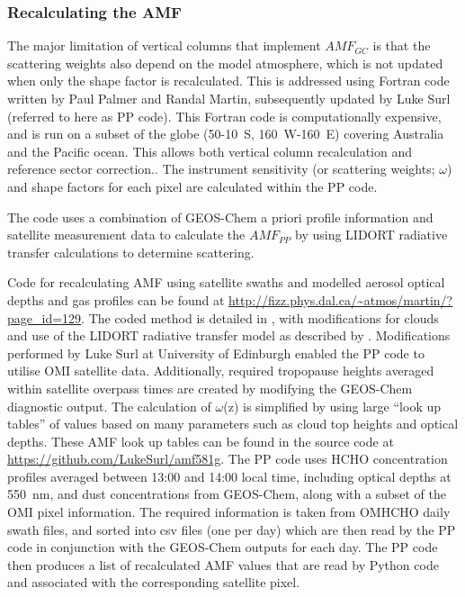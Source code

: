     \subsubsection{Recalculating the AMF}
      \label{Model:omiRecalc:ppcode}
      
      
      The major limitation of vertical columns that implement $AMF_{GC}$ is that the scattering weights also depend on the model atmosphere, which is not updated when only the shape factor is recalculated.
      This is addressed using Fortran code written by Paul Palmer and Randal Martin, subsequently updated by Luke Surl (referred to here as PP code).
      This Fortran code is computationally expensive, and is run on a subset of the globe (50-10\degr~S, 160\degr~W-160\degr~E) covering Australia and the Pacific ocean.
      This allows both vertical column recalculation and reference sector correction..
      The instrument sensitivity (or scattering weights; $\omega$) and shape factors for each pixel are calculated within the PP code.
      
      The code uses a combination of GEOS-Chem a priori profile information and satellite measurement data to calculate the $AMF_{PP}$ by using LIDORT radiative transfer calculations to determine scattering.
      
      
      Code for recalculating AMF using satellite swaths and modelled aerosol optical depths and gas profiles can be found at \url{http://fizz.phys.dal.ca/~atmos/martin/?page_id=129}. 
      The coded method is detailed in \textcite{Palmer2001}, with modifications for clouds and use of the LIDORT radiative transfer model \parencite{Spurr2002} as described by \textcite{Martin2003}.
      Modifications performed by Luke Surl at University of Edinburgh enabled the PP code to utilise OMI satellite data.
      Additionally, required tropopause heights averaged within satellite overpass times are created by modifying the GEOS-Chem diagnostic output.
      The calculation of $\omega$(z) is simplified by using large ``look up tables'' of values based on many parameters such as cloud top heights and optical depths.
      These AMF look up tables can be found in the source code at \url{https://github.com/LukeSurl/amf581g}.
      The PP code uses HCHO concentration profiles averaged between 13:00 and 14:00 local time, including optical depths at 550~nm, and dust concentrations from GEOS-Chem, along with a subset of the OMI pixel information.
      The required information is taken from OMHCHO daily swath files, and sorted into csv files (one per day) which are then read by the PP code in conjunction with the GEOS-Chem outputs for each day.
      The PP code then produces a list of recalculated AMF values that are read by Python code and associated with the corresponding satellite pixel.
    
